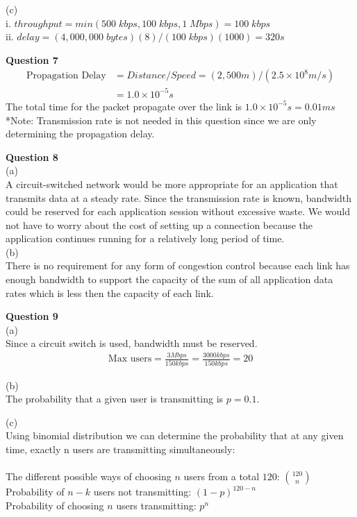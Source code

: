 \documentclass{article}
\begin{document}
(c)\\
i. $throughput = min(500 \; kbps, 100 \; kbps, 1 \; Mbps) = 100 \; kbps$\\
ii. $delay = (4,000,000 \; bytes)(8)/(100 \; kbps)(1000) = 320s$

\bigskip
{\bf Question 7}\\
\begin{equation*}
    \begin{split}
        \text{Propagation Delay} &= Distance/Speed = (2,500m)/(2.5 \times 10^8m/s)\\
        &= 1.0 \times 10^{-5}s
    \end{split}
\end{equation*}
The total time for the packet propagate over the link is $1.0 \times 10^{-5}s = 0.01ms$\\
*Note: Transmission rate is not needed in this question since we are only determining the propagation delay.

\bigskip
{\bf Question 8}\\
(a)\\
A circuit-switched network would be more appropriate for an application that transmits data at a steady rate. Since the transmission rate is known, bandwidth could be reserved for each application session without excessive waste. We would not have to worry about the cost of setting up a connection because the application continues running for a relatively long period of time.\\

(b)\\
There is no requirement for any form of congestion control because each link has enough bandwidth to support the capacity of the sum of all application data rates which is less then the capacity of each link. 

\bigskip
{\bf Question 9}\\
(a)\\
Since a circuit switch is used, bandwidth must be reserved.
\begin{equation*}
    \begin{split}
        \text{Max users} = \frac{3Mbps}{150kbps} = \frac{3000kbps}{150kbps} = 20 
    \end{split}
\end{equation*}

(b)\\
The probability that a given user is transmitting is $p=0.1$.

\bigskip
(c)\\
Using binomial distribution we can determine the probability that at any given time, exactly n users are transmitting simultaneously:\\
\\
The different possible ways of choosing $n$ users from a total $120$: ${120 \choose n}$\\
Probability of $n-k$ users not transmitting: $(1-p)^{120-n}$\\
Probability of choosing $n$ users transmitting: $p^n$\\
\end{document}
